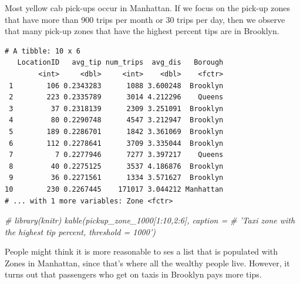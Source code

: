 \documentclass[12pt,twoside]{reedthesis}
\newenvironment{Shaded}{\begin{snugshade}}{\end{snugshade}}
\newcommand{\KeywordTok}[1]{\textcolor[rgb]{0.13,0.29,0.53}{\textbf{#1}}}
\newcommand{\DecValTok}[1]{\textcolor[rgb]{0.00,0.00,0.81}{#1}}
\newcommand{\StringTok}[1]{\textcolor[rgb]{0.31,0.60,0.02}{#1}}
\newcommand{\CommentTok}[1]{\textcolor[rgb]{0.56,0.35,0.01}{\textit{#1}}}
\newcommand{\OperatorTok}[1]{\textcolor[rgb]{0.81,0.36,0.00}{\textbf{#1}}}
\newcommand{\NormalTok}[1]{#1}
\theoremstyle{definition}
\theoremstyle{definition}
\theoremstyle{definition}
\theoremstyle{remark}
\begin{document}
Most yellow cab pick-ups occur in Manhattan. If we focus on the pick-up
zones that have more than 900 trips per month or 30 trips per day, then
we observe that many pick-up zones that have the highest percent tips
are in Brooklyn.
\begin{Shaded}
\end{Shaded}
\begin{verbatim}
# A tibble: 10 x 6
   LocationID   avg_tip num_trips  avg_dis   Borough
        <int>     <dbl>     <int>    <dbl>    <fctr>
 1        106 0.2343283      1088 3.600248  Brooklyn
 2        223 0.2335789      3014 4.212296    Queens
 3         37 0.2318139      2309 3.251091  Brooklyn
 4         80 0.2290748      4547 3.212947  Brooklyn
 5        189 0.2286701      1842 3.361069  Brooklyn
 6        112 0.2278641      3709 3.335044  Brooklyn
 7          7 0.2277946      7277 3.397217    Queens
 8         40 0.2275125      3537 4.186876  Brooklyn
 9         36 0.2271561      1334 3.571627  Brooklyn
10        230 0.2267445    171017 3.044212 Manhattan
# ... with 1 more variables: Zone <fctr>
\end{verbatim}
\begin{Shaded}
\begin{Highlighting}[]
\CommentTok{# library(knitr) kable(pickup_zone_1000[1:10,2:6], caption =}
\CommentTok{# 'Taxi zone with the highest tip percent, threshold = 1000')}
\end{Highlighting}
\end{Shaded}
People might think it is more reasonable to ses a list that is populated
with Zones in Manhattan, since that's where all the wealthy people live.
However, it turns out that passengers who get on taxis in Brooklyn pays
more tips.
\end{document}
